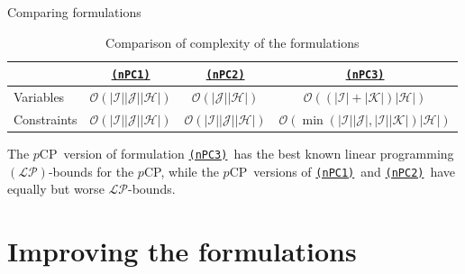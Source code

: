 \documentclass[utf8,aspectratio=169,ngerman,english]{beamer}
\newcommand{\nPC}{\hyperref[eq:nPC]{\texttt{(nPC1)}}\xspace}
\newcommand{\nPCE}{\hyperref[eq:nPCE]{\texttt{(nPC3)}}\xspace}
\newcommand{\nPCY}{\hyperref[eq:nPCY]{\texttt{(nPC2)}}\xspace}
\newcommand{\pCP}{$p$CP\xspace}
\begin{document}
\begin{frame}{Comparing formulations}
    \begin{table}[]
        \centering
        \caption{Comparison of complexity of the formulations}
        \label{tab:complexity}
        \begin{tabular}{l|ccc}
            \hline
                        & \nPC                                                     & \nPCY                                                     & \nPCE                                                                                        \\ \hline
            Variables   & $\mathcal O(| \mathcal I || \mathcal J || \mathcal H |)$ & $\mathcal O (| \mathcal J || \mathcal H |)$               & $\mathcal O ((| \mathcal I | + | \mathcal K |) | \mathcal H |)$                              \\
            Constraints & $\mathcal O(| \mathcal I || \mathcal J || \mathcal H |)$ & $\mathcal O (| \mathcal I || \mathcal J || \mathcal H |)$ & $\mathcal O (\min(| \mathcal I || \mathcal J |,| \mathcal I || \mathcal K |)| \mathcal H |)$ \\ \hline
        \end{tabular}%
    \end{table}\pause
    The \pCP\ version of formulation \nPCE\ has the best known linear programming $(\mathcal{LP})$-bounds for the \pCP,
    while the \pCP\ versions of \nPC\ and \nPCY\ have equally but worse $\mathcal{LP}$-bounds.
\end{frame}

\section{Improving the formulations}
\end{document}
